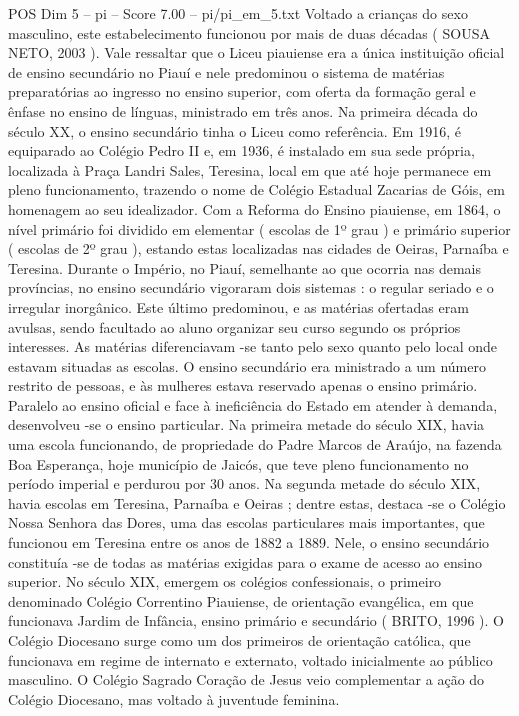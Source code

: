 \begin{textsample}{POS Dim 5 – pi – Score 7.00 – pi/pi\_em\_5.txt}
Voltado a crianças do sexo masculino, este estabelecimento funcionou por mais de duas décadas ( SOUSA NETO, 2003 ).
Vale ressaltar que o Liceu piauiense era a única instituição oficial de ensino secundário no Piauí e nele predominou o sistema de matérias preparatórias ao ingresso no ensino superior, com oferta da formação geral e ênfase no ensino de línguas, ministrado em três anos.
Na primeira década do século XX, o ensino secundário tinha o Liceu como referência.
Em 1916, é equiparado ao Colégio Pedro II e, em 1936, é instalado em sua sede própria, localizada à Praça Landri Sales, Teresina, local em que até hoje permanece em pleno funcionamento, trazendo o nome de Colégio Estadual Zacarias de Góis, em homenagem ao seu idealizador.
Com a Reforma do Ensino piauiense, em 1864, o nível primário foi dividido em elementar ( escolas de 1º grau ) e primário superior ( escolas de 2º grau ), estando estas localizadas nas cidades de Oeiras, Parnaíba e Teresina.
Durante o Império, no Piauí, semelhante ao que ocorria nas demais províncias, no ensino secundário vigoraram dois sistemas : o regular seriado e o irregular inorgânico.
Este último predominou, e as matérias ofertadas eram avulsas, sendo facultado ao aluno organizar seu curso segundo os próprios interesses.
As matérias diferenciavam -se tanto pelo sexo quanto pelo local onde estavam situadas as escolas.
O ensino secundário era ministrado a um número restrito de pessoas, e às mulheres estava reservado apenas o ensino primário.
Paralelo ao ensino oficial e face à ineficiência do Estado em atender à demanda, desenvolveu -se o ensino particular.
Na primeira metade do século XIX, havia uma escola funcionando, de propriedade do Padre Marcos de Araújo, na fazenda Boa Esperança, hoje município de Jaicós, que teve pleno funcionamento no período imperial e perdurou por 30 anos.
Na segunda metade do século XIX, havia escolas em Teresina, Parnaíba e Oeiras ; dentre estas, destaca -se o Colégio Nossa Senhora das Dores, uma das escolas particulares mais importantes, que funcionou em Teresina entre os anos de 1882 a 1889.
Nele, o ensino secundário constituía -se de todas as matérias exigidas para o exame de acesso ao ensino superior.
No século XIX, emergem os colégios confessionais, o primeiro denominado Colégio Correntino Piauiense, de orientação evangélica, em que funcionava Jardim de Infância, ensino primário e secundário ( BRITO, 1996 ).
O Colégio Diocesano surge como um dos primeiros de orientação católica, que funcionava em regime de internato e externato, voltado inicialmente ao público masculino.
O Colégio Sagrado Coração de Jesus veio complementar a ação do Colégio Diocesano, mas voltado à juventude feminina.

\end{textsample}
